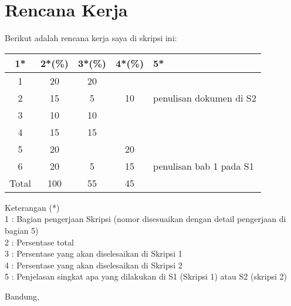 \documentclass[a4paper,twoside]{article}
\begin{document}
\section{Rencana Kerja}

Berikut adalah rencana kerja saya di skripsi ini:

\begin{center}
  \begin{tabular}{ | c | c | c | c | l |}
    \hline
    1*  & 2*(\%) & 3*(\%) & 4*(\%) &5*\\ \hline \hline
    1   & 20  & 20  &  &  \\ \hline
    2   & 15 & 5  & 10  & {\footnotesize penulisan dokumen di S2} \\ \hline
    3   & 10  & 10  &  &   \\ \hline
    4   & 15  & 15  &   &  \\ \hline
    5   & 20 &   & 20 &  \\ \hline
    6   & 20 & 	5 & 15  & {\footnotesize penulisan bab 1 pada S1} \\ \hline
    Total  & 100  & 55  & 45 &  \\ \hline
                          \end{tabular}
\end{center}

Keterangan (*)\\
1 : Bagian pengerjaan Skripsi (nomor disesuaikan dengan detail pengerjaan di bagian 5)\\
2 : Persentase total \\
3 : Persentase yang akan diselesaikan di Skripsi 1 \\
4 : Persentase yang akan diselesaikan di Skripsi 2 \\
5 : Penjelasan singkat apa yang dilakukan di S1 (Skripsi 1) atau S2 (skripsi 2)

\pagebreak
\vspace{1cm}
\centering Bandung, \tanggal\\
\vspace{2cm} \nama \\ 
\vspace{1cm}
\end{document}
